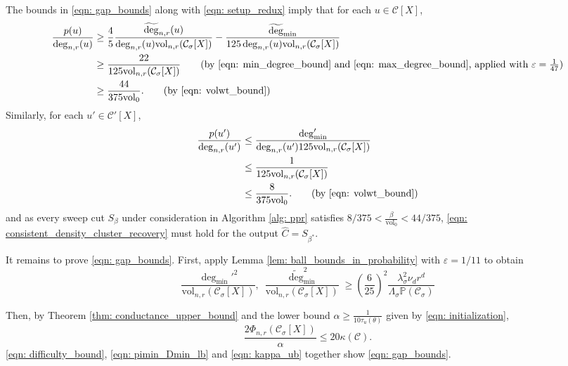 \documentclass[11pt,twoside]{article}
\newcommand{\vol}{\mathrm{vol}}
\newcommand{\1}{\mathbf{1}}
\newcommand{\pbf}{p}        %
\newcommand{\Xbf}{X}             %
\newcommand{\Pbb}{\mathbb{P}}
\newcommand{\Cset}{\mathcal{C}}
\newcommand{\Csig}{\Cset_{\sigma}}
\newcommand{\degminpr}{\deg_{\min}'}
\newcommand{\degminwt}{\widetilde{\deg}_{\min}}
\begin{document}
The bounds in \eqref{eqn: gap_bounds} along with \eqref{eqn: setup_redux} imply that for each $u \in \Cset[\Xbf]$,
\begin{align*}
\frac{\pbf(u)}{\deg_{n,r}(u)} & \geq \frac{4}{5} \frac{\widetilde{\deg}_{n,r}(u)}{\deg_{n,r}(u) \vol_{n,r}(\Csig[\Xbf])} - \frac{\degminwt}{125 \deg_{n,r}(u) \vol_{n,r}(\Csig[\Xbf])} \\
& \geq \frac{22}{125 \vol_{n,r}(\Csig[\Xbf])} \tag{by \eqref{eqn: min_degree_bound} and \eqref{eqn: max_degree_bound}, applied with $\varepsilon = \frac{1}{47}$} \\
& \geq \frac{44}{375 \vol_0}. \tag{by \eqref{eqn: volwt_bound}}
\end{align*}
Similarly, for each $u' \in \Cset'[\Xbf]$,
\begin{align*}
\frac{\pbf(u')}{\deg_{n,r}(u')} & \leq \frac{\degminpr}{\deg_{n,r}(u') 125 \vol_{n,r}(\Csig[\Xbf])}  \\
& \leq \frac{1}{125 \vol_{n,r}(\Csig[\Xbf])} \\
& \leq \frac{8}{375 \vol_0}. \tag{by \eqref{eqn: volwt_bound}}
\end{align*}
and as every sweep cut $S_\beta$ under consideration in Algorithm \ref{alg: ppr} satisfies $8/375 < \frac{\beta}{\vol_0} < 44/375$, \eqref{eqn: consistent_density_cluster_recovery} must hold for the output $\widehat{C} = S_{\beta^*}$.

It remains to prove \eqref{eqn: gap_bounds}. First, apply Lemma \ref{lem: ball_bounds_in_probability} with $\varepsilon = 1/11$ to obtain
\begin{equation}
\label{eqn: pimin_Dmin_lb}
\frac{\degminpr^2}{\vol_{n,r}(\Csig[\Xbf])},~ \frac{\degminwt^2}{\vol_{n,r}(\Csig[\Xbf])} \geq \left(\frac{6}{25}\right)^2 \frac{\lambda_{\sigma}^2 \nu_d r^d}{\Lambda_{\sigma}\Pbb(\Csig)}  
\end{equation}

Then, by Theorem \ref{thm: conductance_upper_bound} and the lower bound $\alpha \geq \frac{1}{10 \tau_{u}(\theta)}$ given by \eqref{eqn: initialization},
\begin{equation}
\label{eqn: difficulty_bound}
\frac{2\Phi_{n,r}(\Csig[\Xbf])}{\alpha} \leq 20\kappa(\Cset).
\end{equation}
\eqref{eqn: difficulty_bound}, \eqref{eqn: pimin_Dmin_lb} and \eqref{eqn: kappa_ub} together show \eqref{eqn: gap_bounds}.
\end{document}

